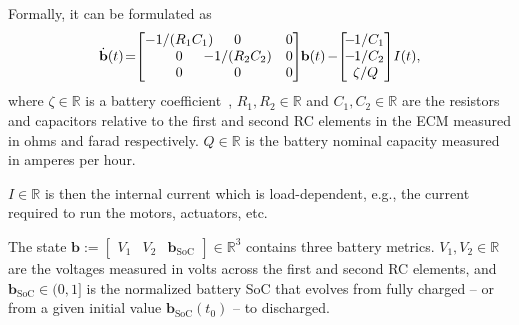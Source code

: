 \documentclass[lettersize,journal,twoside]{IEEEtran}
\theoremstyle{definition}
\begin{document}
Formally, it can be formulated as~\cite{zhao2017observability}
\begin{equation}\label{eq:battmodel}
  \dot{\mathbf{b}}(t)\hspace*{-.4ex}=\hspace*{-.7ex}\begin{bmatrix}-1/(R_1C_1)\hspace*{-2ex}&\hspace*{-2ex}0&0\\\hspace*{2ex}0&\hspace*{-2ex}-1/(R_2C_2)&0\\\hspace*{2ex}0&\hspace*{-2ex}0&0\end{bmatrix}\hspace*{-.6ex}\mathbf{b}(t)\hspace*{-.2ex}-\hspace*{-.6ex}\begin{bmatrix}\hspace*{-.4ex}-\hspace*{-.2ex}1/C_1\\\hspace*{-.4ex}-\hspace*{-.2ex}1/C_2\\\zeta/Q\end{bmatrix}\hspace*{-.4ex}I(t),
\end{equation}
where $\zeta\in\mathbb{R}$ is a battery coefficient~\cite{seewald2022energy}, $R_1,R_2\in\mathbb{R}$ and $C_1,C_2\in\mathbb{R}$ are the resistors and capacitors relative to the first and second RC elements in the ECM measured in ohms and farad respectively.
$Q\in\mathbb{R}$ is the battery nominal capacity measured in amperes per hour.

$I\in\mathbb{R}$ is then the internal current which is load-dependent, e.g., the current required to run the motors, actuators, etc.

The state $\mathbf{b}:=\begin{bmatrix}V_1&V_2&\mathbf{b}_{\text{SoC}}\end{bmatrix}\in\mathbb{R}^3$ contains three battery metrics. $V_1,V_2\in\mathbb{R}$ are the voltages measured in volts across the first and second RC elements, and $\mathbf{b}_{\text{SoC}}\in(0,1]$ is the normalized battery SoC that evolves from fully charged -- or from a given initial value $\mathbf{b}_{\text{SoC}}(t_0)$ -- to discharged.
\end{document}
